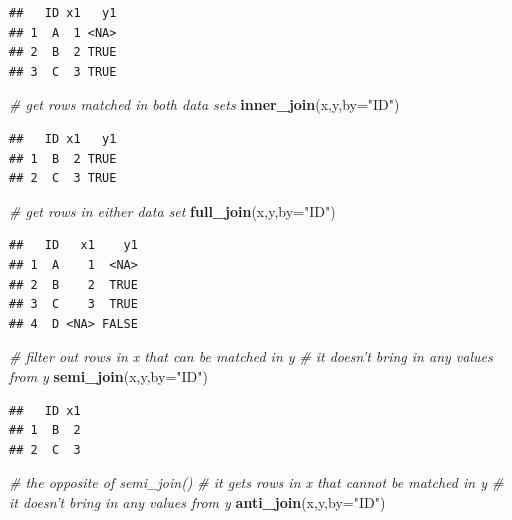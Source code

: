 \documentclass[12pt,]{krantz}
\newenvironment{Shaded}{\begin{snugshade}}{\end{snugshade}}
\newcommand{\KeywordTok}[1]{\textcolor[rgb]{0.13,0.29,0.53}{\textbf{{#1}}}}
\newcommand{\DataTypeTok}[1]{\textcolor[rgb]{0.13,0.29,0.53}{{#1}}}
\newcommand{\StringTok}[1]{\textcolor[rgb]{0.31,0.60,0.02}{{#1}}}
\newcommand{\CommentTok}[1]{\textcolor[rgb]{0.56,0.35,0.01}{\textit{{#1}}}}
\newcommand{\NormalTok}[1]{{#1}}
\theoremstyle{definition}
\theoremstyle{definition}
\theoremstyle{remark}
\begin{document}
\begin{verbatim}
##   ID x1   y1
## 1  A  1 <NA>
## 2  B  2 TRUE
## 3  C  3 TRUE
\end{verbatim}

\begin{Shaded}
\begin{Highlighting}[]
\CommentTok{# get rows matched in both data sets}
\KeywordTok{inner_join}\NormalTok{(x,y,}\DataTypeTok{by=}\StringTok{"ID"}\NormalTok{)}
\end{Highlighting}
\end{Shaded}

\begin{verbatim}
##   ID x1   y1
## 1  B  2 TRUE
## 2  C  3 TRUE
\end{verbatim}

\begin{Shaded}
\begin{Highlighting}[]
\CommentTok{# get rows in either data set}
\KeywordTok{full_join}\NormalTok{(x,y,}\DataTypeTok{by=}\StringTok{"ID"}\NormalTok{)}
\end{Highlighting}
\end{Shaded}

\begin{verbatim}
##   ID   x1    y1
## 1  A    1  <NA>
## 2  B    2  TRUE
## 3  C    3  TRUE
## 4  D <NA> FALSE
\end{verbatim}

\begin{Shaded}
\begin{Highlighting}[]
\CommentTok{# filter out rows in x that can be matched in y }
\CommentTok{# it doesn't bring in any values from y }
\KeywordTok{semi_join}\NormalTok{(x,y,}\DataTypeTok{by=}\StringTok{"ID"}\NormalTok{)}
\end{Highlighting}
\end{Shaded}

\begin{verbatim}
##   ID x1
## 1  B  2
## 2  C  3
\end{verbatim}

\begin{Shaded}
\begin{Highlighting}[]
\CommentTok{# the opposite of  semi_join()}
\CommentTok{# it gets rows in x that cannot be matched in y}
\CommentTok{# it doesn't bring in any values from y}
\KeywordTok{anti_join}\NormalTok{(x,y,}\DataTypeTok{by=}\StringTok{"ID"}\NormalTok{)}
\end{Highlighting}
\end{Shaded}
\end{document}

